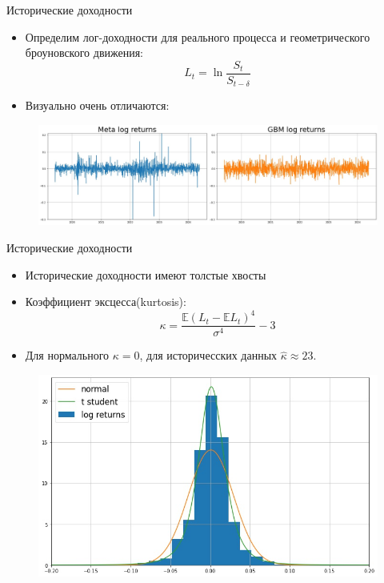 \documentclass{beamer}
\begin{document}
\begin{frame}{Исторические доходности}
    \begin{itemize}
        \item Определим лог-доходности для реального процесса и геометрического броуновского движения:
        $$
            L_t = \ln \dfrac{S_t}{S_{t-\delta}}
        $$
        \item Визуально очень отличаются:
    \end{itemize}
\begin{figure}
    \centering
    \includegraphics[width=1\linewidth]{10_figs/Meta Log returns plot.jpg}
    \label{fig:enter-label}
\end{figure}
\end{frame}
\begin{frame}{Исторические доходности}
    \begin{itemize}
        \item Исторические доходности имеют толстые хвосты
        \item Коэффициент эксцесса(kurtosis):
            $$
                \kappa = \dfrac{\mathbb{E}\left(L_t-\mathbb{E} L_t\right)^4}{\sigma^4} - 3
            $$
        \item Для нормального $\kappa = 0$, для историчесских данных $\hat{\kappa} \approx 23$. 
    \end{itemize}
    \begin{figure}
    \centering
    \includegraphics[width=0.8\linewidth]{10_figs/Meta Log returns hist.jpg}
    \label{fig:enter-label}
\end{figure}
\end{frame}
\end{document}
